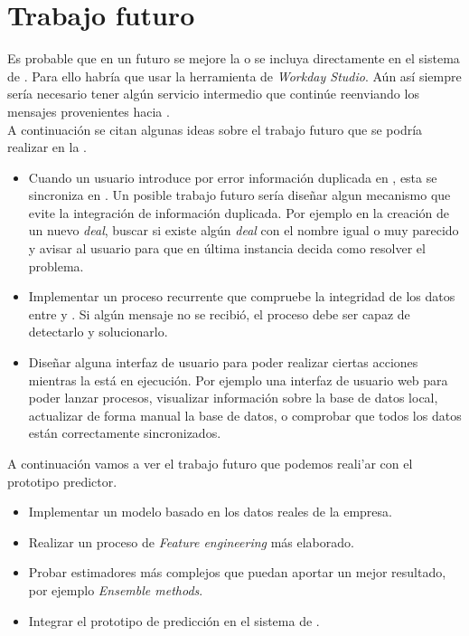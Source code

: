 \chapter{Trabajo futuro}


Es probable que en un futuro se mejore la \iface{} o se incluya directamente en el sistema de \wday{}.
Para ello habría que usar la herramienta de \textit{Workday Studio}.
Aún así siempre sería necesario tener algún servicio intermedio que continúe reenviando los mensajes provenientes \hs{} hacia \wday{}. \\

A continuación se citan algunas ideas sobre el trabajo futuro que se podría realizar en la \iface{}.
\begin{itemize}
	\item Cuando un usuario introduce por error información duplicada en \hs{}, esta se sincroniza en \wday{}. 
	Un posible trabajo futuro sería diseñar algun mecanismo que evite la integración de información duplicada. 
	Por ejemplo en la creación de un nuevo \textit{deal}, buscar si existe algún \textit{deal} con el nombre igual o muy parecido y avisar al usuario para que en última instancia decida como resolver el problema.
	
	\item Implementar un proceso recurrente que compruebe la integridad de los datos entre \hs{} y \wday{}. Si algún mensaje no se recibió, el proceso debe ser capaz de detectarlo y solucionarlo.
	
	\item Diseñar alguna interfaz de usuario para poder realizar ciertas acciones mientras la \iface{} está en ejecución. Por ejemplo una interfaz de usuario web para poder lanzar procesos, visualizar información sobre la base de datos local, actualizar de forma manual la base de datos, o comprobar que todos los datos están correctamente sincronizados.
	
	
\end{itemize}

A continuación vamos a ver el trabajo futuro que podemos reali'ar con el prototipo predictor.


\begin{itemize}
	
	\item Implementar un modelo basado en los datos reales de la empresa.
	
	\item Realizar un proceso de \textit{Feature engineering} más elaborado.
	
	\item Probar estimadores más complejos que puedan aportar un mejor resultado, por ejemplo  \textit{Ensemble methods}.
	
	\item Integrar el prototipo de predicción en el sistema de \wday{}.
	


\end{itemize}



